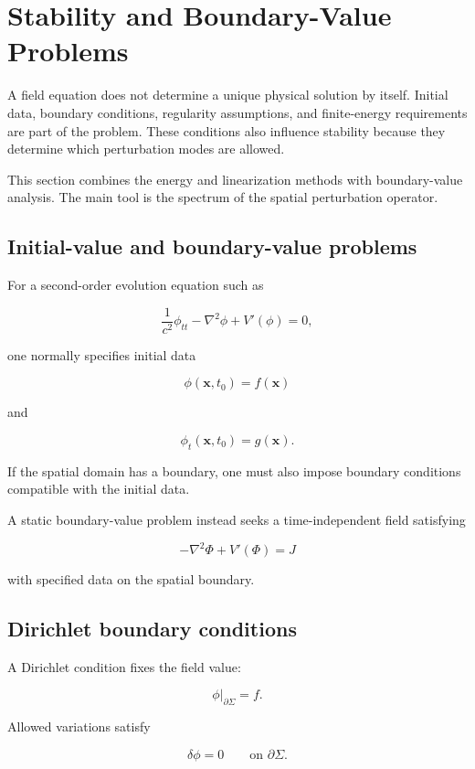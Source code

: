 \section{Stability and Boundary-Value Problems}
\label{sec:stability_and_boundary_value_problems}

A field equation does not determine a unique physical solution by itself. Initial data, boundary conditions, regularity assumptions, and finite-energy requirements are part of the problem. These conditions also influence stability because they determine which perturbation modes are allowed.

This section combines the energy and linearization methods with boundary-value analysis. The main tool is the spectrum of the spatial perturbation operator.

\subsection{Initial-value and boundary-value problems}

For a second-order evolution equation such as

\[
\frac{1}{c^{2}}\phi_{tt}
-
\nabla^{2}\phi
+
V'(\phi)
=0,
\]

one normally specifies initial data

\[
\boxed{
\phi(\mathbf{x},t_{0})
=
f(\mathbf{x})
}
\]

and

\[
\boxed{
\phi_{t}(\mathbf{x},t_{0})
=
g(\mathbf{x})
}.
\]

If the spatial domain has a boundary, one must also impose boundary conditions compatible with the initial data.

A static boundary-value problem instead seeks a time-independent field satisfying

\[
-\nabla^{2}\Phi
+
V'(\Phi)
=
J
\]

with specified data on the spatial boundary.

\subsection{Dirichlet boundary conditions}

A Dirichlet condition fixes the field value:

\[
\boxed{
\phi|_{\partial\Sigma}
=f
}.
\]

Allowed variations satisfy

\[
\delta\phi=0
\qquad
\text{on }\partial\Sigma.
\]

